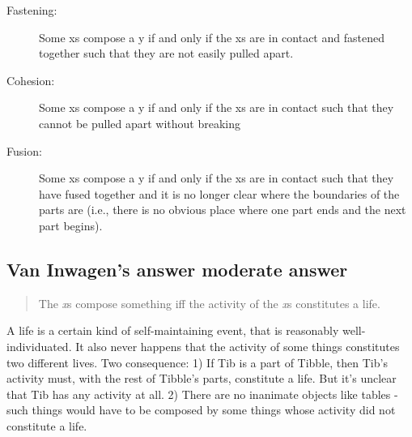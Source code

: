 \documentclass[oneside]{article}
\begin{document}
\begin{description}
\item[Fastening:] Some xs compose a y if and only if the xs are in contact and fastened together such that they are not easily pulled apart.
\item[Cohesion:] Some xs compose a y if and only if the xs are in contact such that they cannot be pulled apart without breaking
\item[Fusion:] Some xs compose a y if and only if the xs are in contact such that they have fused together and it is no longer clear where the boundaries of the parts are (i.e., there is no obvious place where one part ends and the next part begins).
\end{description}
\subsection*{Van Inwagen’s answer moderate answer}
\begin{quote}
The \emph{x}s compose something iff the activity of the \emph{x}s constitutes a life.
\end{quote}
A life is a certain kind of self-maintaining event, that is reasonably well-individuated. It also never happens that the activity of some things constitutes two different lives. Two consequence: 1) If Tib is a part of Tibble, then Tib's activity must, with the rest of Tibble's parts, constitute a life. But it's unclear that Tib has any activity at all. 2) There are no inanimate objects like tables - such things would have to be composed by some things whose activity did not constitute a life.
\end{document}
